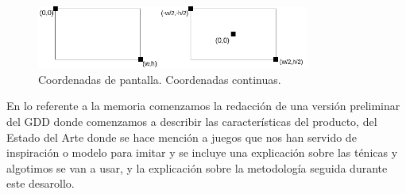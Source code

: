 \begin{figure}[ht]
\centering
\includegraphics[width=0.8\textwidth]{imagenes/diario_desarrollo/sis_coords.png}\\
\hspace{-8mm} Coordenadas de pantalla. \hspace{16mm}  Coordenadas continuas.
\label{fig:sis_coords}
\end{figure} 

En lo referente a la memoria comenzamos la redacción de una versión preliminar del \ac{GDD}
donde comenzamos a describir las características del producto, del Estado del Arte donde se hace
mención a juegos que nos han servido de inspiración o modelo para imitar y se incluye una explicación
sobre las ténicas y algotimos se van a usar, y la explicación sobre la metodología seguida durante
este desarollo. 

\newpage


